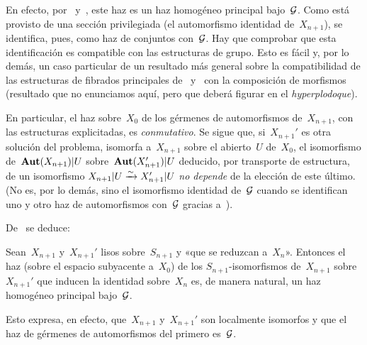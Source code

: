 En efecto, por~ y~, este haz es un haz homogéneo principal bajo~$\cal{G}$. Como está provisto de una sección privilegiada (el automorfismo identidad de~$X_{n+1}$), se identifica, pues, como haz de conjuntos con~$\cal{G}$. Hay que comprobar que esta identificación es compatible con las estructuras de grupo. Esto es fácil y, por lo demás, un caso particular de un resultado más general sobre la compatibilidad de las estructuras de fibrados principales de~ y~ con la composición de morfismos (resultado que no enunciamos aquí, pero que deberá figurar en el \emph{hyperplodoque}).

En particular, el haz sobre~$X_0$ de los gérmenes de automorfismos de~$X_{n+1}$, con las estructuras explicitadas, es \emph{conmutativo}. Se sigue que, si~$X_{n+1}'$ es otra solución del problema, isomorfa a~$X_{n+1}$ sobre el abierto~$U$ de~$X_0$, el isomorfismo de~$\SheafAut(X_{n+1})|U$ sobre~$\SheafAut(X_{n+1}')|U$ deducido, por transporte de estructura, de un isomorfismo $X_{n+1}|U\isomto X_{n+1}'|U$ \emph{no depende} de la elección de este último. (No es, por lo demás, sino el isomorfismo identidad de~$\cal{G}$ cuando se identifican uno y otro haz de automorfismos con~$\cal{G}$ gracias a~).

De~ se deduce:

\begin{corollaire}
\label{III.6.2}
Sean~$X_{n+1}$ y~$X_{n+1}'$ lisos sobre~$S_{n+1}$ y «que se reduzcan a~$X_n$». Entonces el haz (sobre el espacio subyacente a~$X_0$) de los $S_{n+1}$-isomorfismos de~$X_{n+1}$ sobre~$X_{n+1}'$ que inducen la identidad sobre~$X_n$ es, de manera natural, un haz homogéneo principal bajo~$\cal{G}$.
\end{corollaire}

Esto expresa, en efecto, que~$X_{n+1}$ y~$X_{n+1}'$ son localmente isomorfos y que el haz de gérmenes de automorfismos del primero es~$\cal{G}$.

